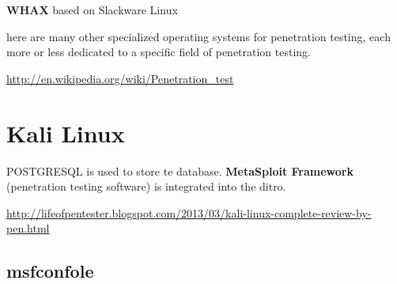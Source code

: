 {\bf WHAX} based on Slackware Linux

here are many other specialized operating systems for penetration testing, each
more or less dedicated to a specific field of penetration testing.

\url{http://en.wikipedia.org/wiki/Penetration_test}


\section{Kali Linux}

POSTGRESQL is used to store te database. 
{\bf MetaSploit Framework} (penetration testing software) is integrated into the
ditro.
  
  \url{http://lifeofpentester.blogspot.com/2013/03/kali-linux-complete-review-by-pen.html}
  
\subsection{msfconfole}